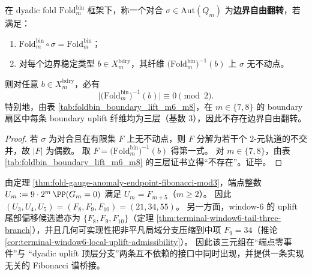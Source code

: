 \begin{proposition}\label{prop:bdry-three-layer-obstructs-free-z2}
在 dyadic fold \(\mathrm{Fold}^{\mathrm{bin}}_m\) 框架下，称一个对合 \(\sigma\in\mathrm{Aut}(Q_m)\) 为\textbf{边界自由翻转}，若满足：
\begin{enumerate}
  \item \(\mathrm{Fold}^{\mathrm{bin}}_m\circ\sigma=\mathrm{Fold}^{\mathrm{bin}}_m\)；
  \item 对每个边界稳定类型 \(b\in X_m^{\mathrm{bdry}}\)，其纤维 \(\bigl(\mathrm{Fold}^{\mathrm{bin}}_m\bigr)^{-1}(b)\) 上 \(\sigma\) 无不动点。
\end{enumerate}
则对任意 \(b\in X_m^{\mathrm{bdry}}\)，必有
\[
\bigl|\bigl(\mathrm{Fold}^{\mathrm{bin}}_m\bigr)^{-1}(b)\bigr|\equiv 0\pmod 2.
\]
特别地，由表 \ref{tab:foldbin_boundary_lift_m6_m8}，在 \(m\in\{7,8\}\) 的 boundary 扇区中每条 boundary uplift 纤维均为三层（基数 \(3\)），因此不存在边界自由翻转。
\end{proposition}

\begin{proof}
若 \(\sigma\) 为对合且在有限集 \(F\) 上无不动点，则 \(F\) 分解为若干个 \(2\)-元轨道的不交并，故 \(|F|\) 为偶数。
取 \(F=\bigl(\mathrm{Fold}^{\mathrm{bin}}_m\bigr)^{-1}(b)\) 得第一式。
对 \(m\in\{7,8\}\)，由表 \ref{tab:foldbin_boundary_lift_m6_m8} 的三层证书立得“不存在”。证毕。
\end{proof}

\begin{remark}\label{rem:bdry-fibonacci-bridge-endpoint-spectrum}
由定理 \ref{thm:fold-gauge-anomaly-endpoint-fibonacci-mod3}，端点整数
\(
U_m:=9\cdot 2^m\,\PP(G_m=0)
\)
满足 \(U_m=F_{m+5}\)（\(m\ge 2\)）。
因此
\(
(U_3,U_4,U_5)=(F_8,F_9,F_{10})=(21,34,55)
\)。
另一方面，window-\(6\) 的 uplift 尾部偏移候选谱亦为 \(\{F_8,F_9,F_{10}\}\)（定理 \ref{thm:terminal-window6-tail-three-branch}），并且几何可实现性把非平凡局域分支压缩到中项 \(F_9=34\)（推论 \ref{cor:terminal-window6-local-uplift-admissibility}）。
因此该三元组在“端点零事件”与 “dyadic uplift 顶层分支”两条互不依赖的接口中同时出现，并提供一条实现无关的 Fibonacci 谱桥接。
\end{remark}



